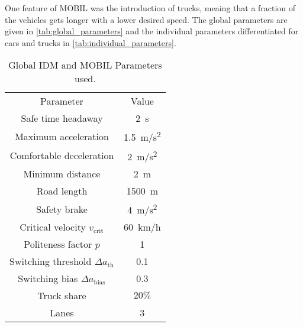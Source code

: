 One feature of MOBIL was the introduction of trucks, meaing that a fraction of the vehicles gets
longer with a lower desired speed. The global parameters are given in
\autoref{tab:global_parameters} and the individual parameters differentiated for cars and trucks in
\autoref{tab:individual_parameters}.
\begin{table}[b]%
  \caption{\label{tab:global_parameters}%
    Global IDM and MOBIL Parameters used.
  }
  \begin{ruledtabular}
    \begin{tabular}{c c}
      Parameter 
  & Value \\
  \colrule
      Safe time headaway          & \SI{2}{s}         \\
      Maximum acceleration        & \SI{1.5}{m/s^2}       \\
      Comfortable deceleration    & \SI{2}{m/s^2} \\
      Minimum distance            & \SI{2}{m} \\
      Road length                 & \SI{1500}{m} \\
      Safety brake                & \SI{4}{m/s^2} \\
      Critical velocity $v_\text{crit}$ & \SI{60}{km/h} \\
      Politeness factor $p$       & 1 \\
      Switching threshold $\Delta a_\text{th}$ & 0.1 \\
      Switching bias  $\Delta a_\text{bias}$ & 0.3 \\
      Truck share & $20\%$ \\
      Lanes & 3 \\
    \end{tabular}
  \end{ruledtabular}
\end{table}


